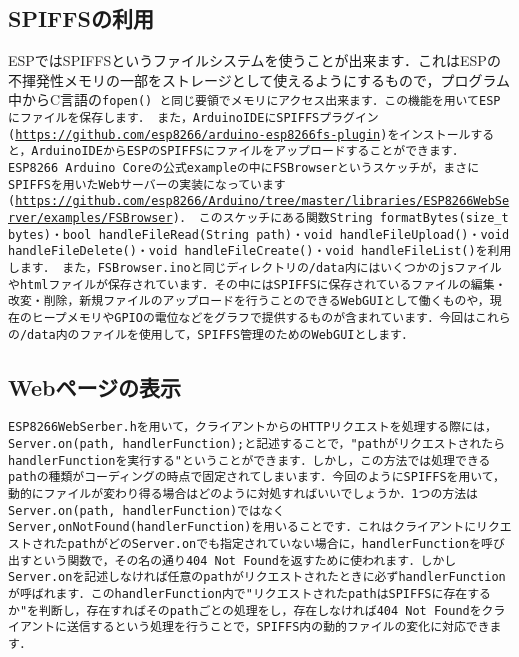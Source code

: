 \subsection{SPIFFSの利用}
ESPではSPIFFSというファイルシステムを使うことが出来ます．これはESPの不揮発性メモリの一部をストレージとして使えるようにするもので，プログラム中からC言語の\tt{fopen()}\rm{} と同じ要領でメモリにアクセス出来ます．この機能を用いてESPにファイルを保存します．
また，ArduinoIDEにSPIFFSプラグイン(\url{https://github.com/esp8266/arduino-esp8266fs-plugin})をインストールすると，ArduinoIDEからESPのSPIFFSにファイルをアップロードすることができます．
ESP8266 Arduino Coreの公式exampleの中にFSBrowserというスケッチが，まさにSPIFFSを用いたWebサーバーの実装になっています(\url{https://github.com/esp8266/Arduino/tree/master/libraries/ESP8266WebServer/examples/FSBrowser})．
このスケッチにある関数\tt{String formatBytes(size\_t bytes)}\rm{}・\tt{bool handleFileRead(String path)}\rm{}・\tt{void handleFileUpload()}\rm{}・\tt{void handleFileDelete()}\rm{}・\tt{void  handleFileCreate()}\rm{}・\tt{void  handleFileList()}\rm{}を利用します．
また，FSBrowser.inoと同じディレクトリの\tt{/data}\rm{}内にはいくつかのjsファイルやhtmlファイルが保存されています．その中にはSPIFFSに保存されているファイルの編集・改変・削除，新規ファイルのアップロードを行うことのできるWebGUIとして働くものや，現在のヒープメモリやGPIOの電位などをグラフで提供するものが含まれています．今回はこれらの\tt{/data}\rm{}内のファイルを使用して，SPIFFS管理のためのWebGUIとします．

\subsection{Webページの表示}
\tt{ESP8266WebSerber.h}\rm{}を用いて，クライアントからのHTTPリクエストを処理する際には，\tt{Server.on(path, handlerFunction);}\rm{}と記述することで，"\tt{path}\rm{}がリクエストされたら\tt{handlerFunction}\rm{}を実行する"ということができます．しかし，この方法では処理できる\tt{path}\rm{}の種類がコーディングの時点で固定されてしまいます．今回のようにSPIFFSを用いて，動的にファイルが変わり得る場合はどのように対処すればいいでしょうか．1つの方法は\tt{Server.on(path, handlerFunction)}\rm{}ではなく\tt{Server,onNotFound(handlerFunction)}\rm{}を用いることです．これはクライアントにリクエストされた\tt{path}\rm{}がどの\tt{Server.on}\rm{}でも指定されていない場合に，\tt{handlerFunction}\rm{}を呼び出すという関数で，その名の通り404 Not Foundを返すために使われます．しかし\tt{Server.on}\rm{}を記述しなければ任意の\tt{path}\rm{}がリクエストされたときに必ず\tt{handlerFunction}\rm{}が呼ばれます．この\tt{handlerFunction}\rm{}内で"リクエストされた\tt{path}\rm{}はSPIFFSに存在するか"を判断し，存在すればその\tt{path}\rm{}ごとの処理をし，存在しなければ404 Not Foundをクライアントに送信するという処理を行うことで，SPIFFS内の動的ファイルの変化に対応できます．

